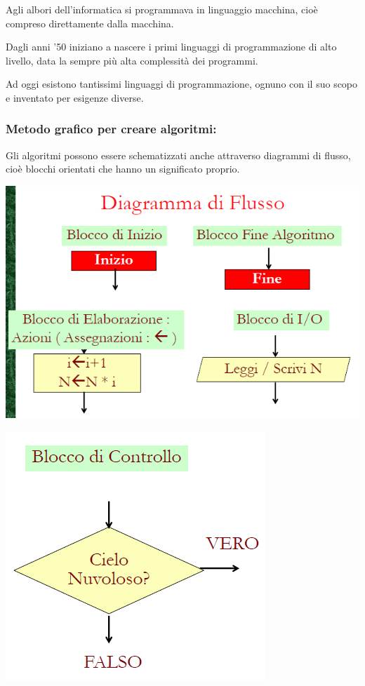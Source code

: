 \documentclass[
  paper=a4,
  oneside  ,captions=tableheading
]{scrbook}
\begin{document}
Agli albori dell'informatica si programmava in linguaggio macchina, cioè
compreso direttamente dalla macchina.

Dagli anni '50 iniziano a nascere i primi linguaggi di programmazione di
alto livello, data la sempre più alta complessità dei programmi.

Ad oggi esistono tantissimi linguaggi di programmazione, ognuno con il
suo scopo e inventato per esigenze diverse.

\hypertarget{metodo-grafico-per-creare-algoritmi}{%
\subsubsection{Metodo grafico per creare
algoritmi:}\label{metodo-grafico-per-creare-algoritmi}}

Gli algoritmi possono essere schematizzati anche attraverso diagrammi di
flusso, cioè blocchi orientati che hanno un significato proprio.

\includegraphics{./image/image-20201111002115408.png}

\includegraphics{./image/image-20201111002130617.png}
\end{document}
